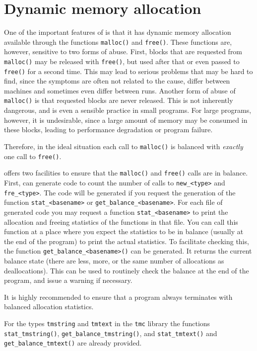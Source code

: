 \section{Dynamic memory allocation}
\label{s.allocation}
One of the important features of {\C} is that it has dynamic memory allocation
available through the functions \verb+malloc()+ and \verb+free()+.
These functions are, however, sensitive to two forms of abuse.
First,
blocks that are requested from \verb+malloc()+
may be released with \verb+free()+, but used after that or even passed to
\verb+free()+ for a second time.
This may lead to serious problems that may be hard to find,
since the symptoms are often not related to the cause, differ between machines
and sometimes even differ between runs.
Another form of abuse of \verb+malloc()+ is that requested blocks are
never released.
This is not inherently dangerous,
and is even a sensible practice in small programs.
For large programs, however, it is undesirable,
since a large amount of memory may be consumed in these blocks,
leading to performance degradation or program failure.
\par
Therefore,
in the ideal situation each call to \verb+malloc()+ is balanced with
{\em exactly} one call to \verb+free()+.
\par
{\Tm} offers two facilities to ensure that the \verb+malloc()+
and \verb+free()+ calls are in balance.
First,
{\Tm} can generate code to count the number of calls to \verb+new_<type>+
and \verb+fre_<type>+.
The code will be generated if you request the generation of the
function \verb'stat_<basename>' or \verb'get_balance_<basename>'.
For each file of generated {\C} code you may request a function
\verb+stat_<basename>+ to print the allocation and freeing statistics of the
functions in that file.
You can call this function at a place where you expect the statistics
to be in balance (usually at the end of the program) to 
print the actual statistics.
To facilitate checking this, the function \verb+get_balance_<basename>()+
can be generated. It returns the current balance state (there are less, more,
or the same number of allocations as deallocations).
This can be used to routinely check the balance at the end of the program,
and issue a warning if necessary.
\par
It is highly recommended to ensure that a program always terminates
with balanced allocation statistics.
\par
\begin{sloppypar}
For the types \verb'tmstring' and \verb'tmtext' in the \verb'tmc' library
the functions \verb+stat_tmstring()+, \verb+get_balance_tmstring()+,
and \verb+stat_tmtext()+ and \verb+get_balance_tmtext()+ are already provided.
\end{sloppypar}
